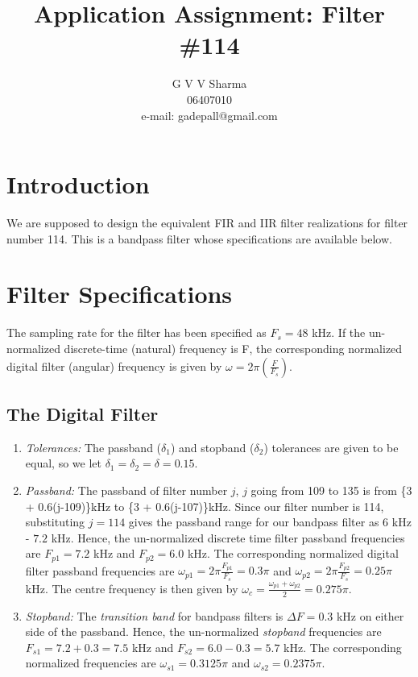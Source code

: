 \documentclass{article}
\begin{document}
\title{ Application Assignment: Filter \#114}

\author{G V V Sharma \\06407010\\ e-mail: gadepall@gmail.com	}

\maketitle
\fi
\section{Introduction}
We are supposed to design the equivalent FIR and IIR filter realizations for filter number 114.  
This is a bandpass filter whose specifications are available below.

\section{Filter Specifications}
The sampling rate for the filter has been specified as $F_s =  48$ kHz.	If the un-normalized  discrete-time (natural) frequency is F, the corresponding normalized digital filter (angular) frequency is given by $\omega = 2\pi
\left(\frac{F}{F_s}\right)$.

\subsection{The Digital Filter}

\begin{enumerate}
\item {\em Tolerances:}  The passband ($\delta_1$) and stopband ($\delta_2$) tolerances are given to
be equal, so we let $\delta_1 = \delta_2 = \delta = 0.15$.

\item {\em Passband:}  The passband of filter number $j$, $j$ going from 109 to 135 is from \{3 + 0.6(j-109)\}kHz
to \{3 + 0.6(j-107)\}kHz.  Since our filter number is 114, substituting $j = 114$ gives the passband
range for our bandpass filter as $6$ kHz - $7.2$ kHz.  Hence, the un-normalized discrete time filter
passband frequencies are $F_{p1} = 7.2$ kHz
and $F_{p2} = 6.0$ kHz.  The corresponding normalized digital filter passband frequencies are
$\omega_{p1} = 2\pi\frac{F_{p1}}{F_s}  = 0.3\pi$  and $\omega_{p2} = 2\pi\frac{F_{p2}}{F_s}  = 0.25 \pi$ kHz.  The centre frequency is then given by  $\omega_c = \frac{\omega_{p1} + \omega_{p2}}{2} = 0.275\pi$.  

\item {\em Stopband:}  The {\em transition band} for bandpass filters is $\Delta F = 0.3$ kHz on either side of the passband.
Hence, the un-normalized {\em stopband} frequencies are $F_{s1} = 7.2 + 0.3 = 7.5$ kHz and $F	_{s2} = 6.0 - 0.3 = 5.7$ kHz.  The corresponding normalized frequencies are $\omega_{s1} = 0.3125 \pi$  and $\omega_{s2} =  0.2375 \pi$.
\end{enumerate}
\end{document}
